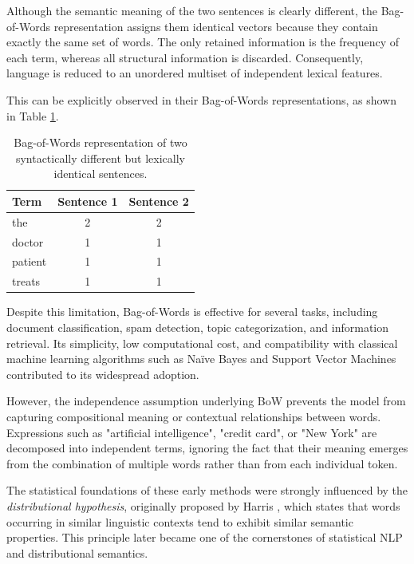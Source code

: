 Although the semantic meaning of the two sentences is clearly different, the Bag-of-Words representation assigns them identical vectors because they contain exactly the same set of words. The only retained information is the frequency of each term, whereas all structural information is discarded. Consequently, language is reduced to an unordered multiset of independent lexical features.

This can be explicitly observed in their Bag-of-Words representations, as shown in Table \ref{tab:bow_example}.

\begin{table}[h]
\centering
\begin{tabular}{lcc}
\hline
\textbf{Term} & \textbf{Sentence 1} & \textbf{Sentence 2} \\
\hline
the        & 2 & 2 \\
doctor     & 1 & 1 \\
patient    & 1 & 1 \\
treats     & 1 & 1 \\
\hline
\end{tabular}
\caption{Bag-of-Words representation of two syntactically different but lexically identical sentences.}
\label{tab:bow_example}
\end{table}


Despite this limitation, Bag-of-Words is effective for several tasks, including document classification, spam detection, topic categorization, and information retrieval. Its simplicity, low computational cost, and compatibility with classical machine learning algorithms such as Naïve Bayes and Support Vector Machines \cite{manning2008introduction} contributed to its widespread adoption.

However, the independence assumption underlying BoW prevents the model from capturing compositional meaning or contextual relationships between words. Expressions such as "artificial intelligence", "credit card", or "New York" are decomposed into independent terms, ignoring the fact that their meaning emerges from the combination of multiple words rather than from each individual token.

The statistical foundations of these early methods were strongly influenced by the \textit{distributional hypothesis}, originally proposed by Harris \cite{harris1954distributional}, which states that words occurring in similar linguistic contexts tend to exhibit similar semantic properties. This principle later became one of the cornerstones of statistical NLP and distributional semantics.

